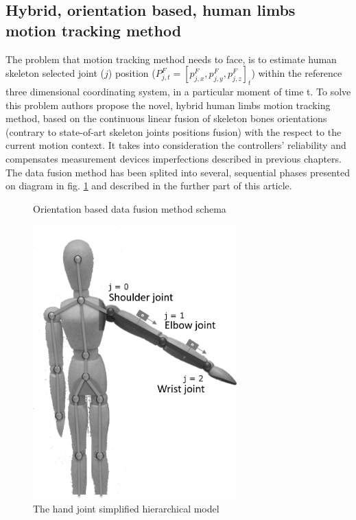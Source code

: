 \documentclass[sensors,article,submit,moreauthors,pdftex,10pt,a4paper]{mdpi}
\begin{document}
	\subsection{Hybrid, orientation based, human limbs motion tracking method}
	The problem that motion tracking method needs to face, is to estimate human skeleton selected joint ($j$) position ($P^F_{j,t} = [p^F_{j,x}, p^F_{j,y}, p^F_{j,z}]_t$) within the reference three dimensional coordinating system, in a particular moment of time t. To solve this problem authors propose the novel, hybrid human limbs motion tracking method, based on the continuous linear fusion of skeleton bones orientations (contrary to state-of-art skeleton joints positions fusion) with the respect to the current motion context. It takes into consideration the controllers’ reliability and compensates measurement devices imperfections described in previous chapters. The data fusion method has been splited into several, sequential phases presented on diagram in fig. \ref{fig:methodPhases} and described in the further part of this article. 
		
	\begin{minipage}{\linewidth}
		\centering
		\begin{minipage}[b]{0.45\linewidth}
			\begin{figure}[H]
				\scalebox{0.45}{
					
				}
				\caption{Orientation based data fusion method schema}
				\label{fig:methodPhases}
			\end{figure}
		\end{minipage}
		\hfill
		\begin{minipage}[b]{0.45\linewidth}
			\begin{figure}[H]
				\includegraphics[width=0.7\textwidth]{Figure11.png}
				\caption{The hand joint simplified hierarchical model}		
				\label{fig:hybrid:jointsHierarchy}	
			\end{figure}
		\end{minipage}
	\end{minipage}
		
\end{document}
